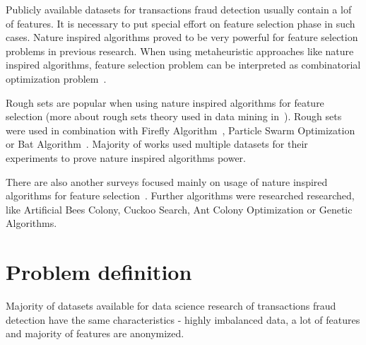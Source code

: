 \documentclass[runningheads]{llncs}
\begin{document}
Publicly available datasets for transactions fraud detection usually contain a lof of features. It is necessary to put special effort on feature selection phase in such cases. Nature inspired algorithms proved to be very powerful for feature selection problems in previous research. When using metaheuristic approaches like nature inspired algorithms, feature selection problem can be interpreted as combinatorial optimization problem~\cite{Wang2016}.

Rough sets are popular when using nature inspired algorithms for feature selection (more about rough sets theory used in data mining in~\cite{Slimani2013}). Rough sets were used in combination with Firefly Algorithm~\cite{Banati2011}, Particle Swarm Optimization~\cite{Wang2007} or Bat Algorithm~\cite{Emary2014}. Majority of works used multiple datasets for their experiments to prove nature inspired algorithms power.

There are also another surveys focused mainly on usage of nature inspired algorithms for feature selection~\cite{Kauser2018,Wang2016,Yang2020}. Further algorithms were researched researched, like Artificial Bees Colony, Cuckoo Search, Ant Colony Optimization or Genetic Algorithms.



\section{Problem definition}



Majority of datasets available for data science research of transactions fraud detection have the same characteristics - highly imbalanced data, a lot of features and majority of features are anonymized.
\end{document}
